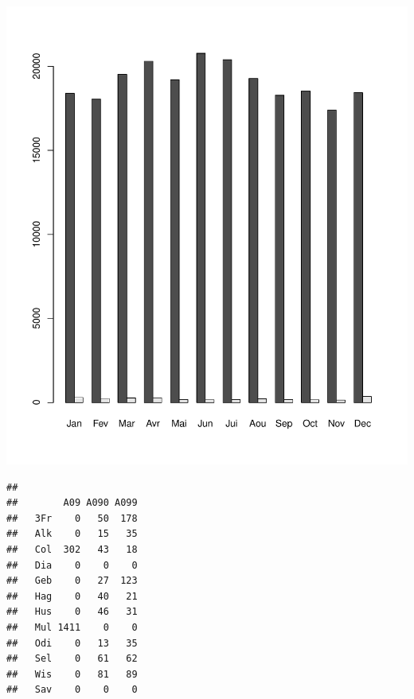 \documentclass[12pt,english,french,twoside]{book}\usepackage[]{graphicx}\usepackage[]{color}
\makeatletter
\def\maxwidth{ %
  \ifdim\Gin@nat@width>\linewidth
    \linewidth
  \else
    \Gin@nat@width
  \fi
}
\newenvironment{kframe}{%
 \def\at@end@of@kframe{}%
 \ifinner\ifhmode%
  \def\at@end@of@kframe{\end{minipage}}%
  \begin{minipage}{\columnwidth}%
 \fi\fi%
 \def\FrameCommand##1{\hskip\@totalleftmargin \hskip-\fboxsep
 \colorbox{shadecolor}{##1}\hskip-\fboxsep
     \hskip-\linewidth \hskip-\@totalleftmargin \hskip\columnwidth}%
 \MakeFramed {\advance\hsize-\width
   \@totalleftmargin\z@ \linewidth\hsize
   \@setminipage}}%
 {\par\unskip\endMakeFramed%
 \at@end@of@kframe}
\newenvironment{knitrout}{}{} %
\makeatother
\begin{document}
\begin{knitrout}
\color{fgcolor}

{\centering \includegraphics[width=\maxwidth]{figure/invs_barplot-1} 

}



\end{knitrout}


\begin{knitrout}
\color{fgcolor}\begin{kframe}
\begin{verbatim}
##      
##        A09 A090 A099
##   3Fr    0   50  178
##   Alk    0   15   35
##   Col  302   43   18
##   Dia    0    0    0
##   Geb    0   27  123
##   Hag    0   40   21
##   Hus    0   46   31
##   Mul 1411    0    0
##   Odi    0   13   35
##   Sel    0   61   62
##   Wis    0   81   89
##   Sav    0    0    0
\end{verbatim}
\end{kframe}
\end{knitrout}

\end{document}
